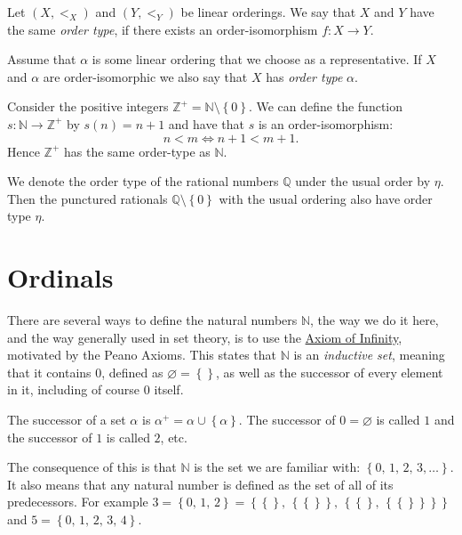 \documentclass[../../main.tex]{subfiles}
\begin{document}
\begin{definition}\cite[Definitions 1.12, 1.13]{Ros82}
    Let $(X, <_X)$ and $(Y, <_Y)$ be linear orderings.
    We say that $X$ and $Y$ have the same \textit{order type}, if there exists an order-isomorphism $f: X \to Y$.

    Assume that $\alpha$ is some linear ordering that we choose as a representative.
    If $X$ and $\alpha$ are order-isomorphic we also say that $X$ has \textit{order type} $\alpha$.
\end{definition}

\begin{example}
    Consider the positive integers $\mathbb{Z}^+ = \mathbb{N} \setminus \left\{0\right\}$.
    We can define the function $s: \mathbb{N} \to \mathbb{Z^+}$ by $s(n) = n + 1$ and have that $s$ is an order-isomorphism:
    $$n < m \iff n+1 < m+1.$$
    Hence $\mathbb{Z}^+$ has the same order-type as $\mathbb{N}$.
\end{example}

\begin{example}\cite[Exercise 2.3]{Ros82}
    We denote the order type of the rational numbers $\mathbb{Q}$ under the usual order by $\eta$.
    Then the punctured rationals $\mathbb{Q} \setminus \left\{0\right\}$ with the usual ordering also have order type $\eta$.
\end{example}

\section{Ordinals}\label{ordinals-section}
There are several ways to define the natural numbers $\mathbb{N}$, the way we do it here, and the way generally used in set theory, is to use the \hyperref[ZF7]{Axiom of Infinity}, motivated by the Peano Axioms.
This states that $\mathbb{N}$ is an \textit{inductive set}, meaning that it contains $0$, defined as $\varnothing = \left\{\right\}$, as well as the successor of every element in it, including of course $0$ itself. \cite[p.39]{Gol17}

\begin{definition}\cite[p.38]{Gol17}
    The successor of a set $\alpha$ is $\alpha^+ = \alpha \cup \left\{\alpha\right\}$.
    The successor of $0 = \varnothing$ is called $1$ and the successor of $1$ is called $2$, etc.
\end{definition}

The consequence of this is that $\mathbb{N}$ is the set we are familiar with: $\left\{0,\, 1,\, 2,\, 3,\ldots\right\}$.
It also means that any natural number is defined as the set of all of its predecessors.
For example $3 = \left\{0,\, 1,\, 2\right\} = \left\{\left\{\right\},\, \left\{\left\{\right\}\right\},\, \left\{\left\{\right\},\, \left\{\left\{\right\}\right\}\right\}\right\}$ and $5 = \left\{0,\, 1,\, 2,\, 3,\, 4\right\}$.
\end{document}
